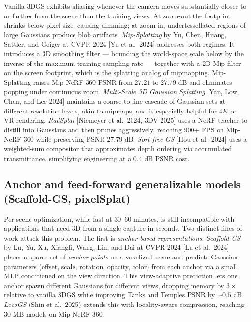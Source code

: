 Vanilla 3DGS exhibits aliasing whenever the camera moves substantially closer to or farther from the scene than the training views. At zoom-out the footprint shrinks below pixel size, causing dimming; at zoom-in, undertessellated regions of large Gaussians produce blob artifacts. \emph{Mip-Splatting} by Yu, Chen, Huang, Sattler, and Geiger at CVPR \(2024\) {[}Yu et al.~2024{]} addresses both regimes. It introduces a 3D smoothing filter --- bounding the world-space scale below by the inverse of the maximum training sampling rate --- together with a 2D Mip filter on the screen footprint, which is the splatting analog of mipmapping. Mip-Splatting raises Mip-NeRF 360 PSNR from \(27.21\) to \(27.79\) dB and eliminates popping under continuous zoom. \emph{Multi-Scale 3D Gaussian Splatting} {[}Yan, Low, Chen, and Lee 2024{]} maintains a coarse-to-fine cascade of Gaussian sets at different resolution levels, akin to mipmaps, and is especially helpful for \(4K\) or VR rendering. \emph{RadSplat} {[}Niemeyer et al.~2024, 3DV 2025{]} uses a NeRF teacher to distill into Gaussians and then prunes aggressively, reaching \(900\)+ FPS on Mip-NeRF 360 while preserving PSNR \(27.79\) dB. \emph{Sort-free GS} {[}Hou et al.~2024{]} uses a weighted-sum compositor that approximates depth ordering via accumulated transmittance, simplifying engineering at a \(0.4\) dB PSNR cost.

\subsection{Anchor and feed-forward generalizable models (Scaffold-GS, pixelSplat)}\label{anchor-and-feed-forward-generalizable-models-scaffold-gs-pixelsplat}

Per-scene optimization, while fast at \(30\)--\(60\) minutes, is still incompatible with applications that need 3D from a single capture in seconds. Two distinct lines of work attack this problem. The first is \emph{anchor-based representations}. \emph{Scaffold-GS} by Lu, Yu, Xu, Xiangli, Wang, Lin, and Dai at CVPR 2024 {[}Lu et al.~2024{]} places a sparse set of \emph{anchor points} on a voxelized scene and predicts Gaussian parameters (offset, scale, rotation, opacity, color) from each anchor via a small MLP conditioned on the view direction. This view-adaptive prediction lets one anchor spawn different Gaussians for different views, dropping memory by \(3\times\) relative to vanilla 3DGS while improving Tanks and Temples PSNR by \(\sim 0.5\) dB. \emph{LocoGS} (Shin et al.~2025) extends this with locality-aware compression, reaching \(30\) MB models on Mip-NeRF 360.

